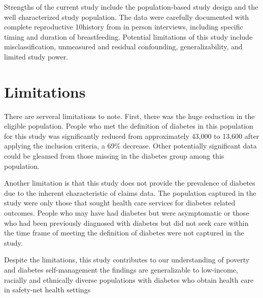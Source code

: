\documentclass [11pt, proquest] {uwthesis}[2015/03/03]
\begin{document}
Strengths of the current study include the population-based study design
and the well characterized study population. The data were carefully
documented with complete reproductive 10history from in person
interviews, including specific timing and duration of breastfeeding.
Potential limitations of this study include misclassification,
unmeasured and residual confounding, generalizability, and limited study
power.

\section{Limitations}\label{limitations}

There are serveral limitations to note. First, there was the huge
reduction in the eligible population. People who met the definition of
diabetes in this population for this study was significantly reduced
from approximately 43,000 to 13,600 after applying the inclusion
criteria, a 69\% decrease. Other potentially significant data could be
gleamed from those missing in the diabetes group among this population.

Another limitation is that this study does not provide the prevalence of
diabetes due to the inherent characteristic of claims data. The
population captured in the study were only those that sought health care
services for diabetes related outcomes. People who may have had diabetes
but were asymptomatic or those who had been previously diagnosed with
diabetes but did not seek care within the time frame of meeting the
definition of diabetes were not captured in the study.

Despite the limitations, this study contributes to our understanding of
poverty and diabetes self-management the findings are generalizable to
low-income, racially and ethnically diverse populations with diabetes
who obtain health care in safety-net health settings

\appendix
\end{document}
